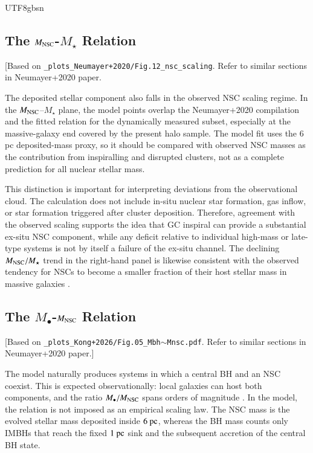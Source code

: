 \documentclass[trackchanges, twocolappendix, twocolumn]{aastex701}
\newcommand{\czkong}[1]{{\color{magenta}#1}}
\begin{document}
\begin{CJK*}{UTF8}{gbsn}
\subsection{The $M_{\rm NSC}$-$M_\star$ Relation} \label{subsect:Mnsc-Mstar}

\czkong{[Based on \texttt{\_plots\_Neumayer+2020/Fig.12\_nsc\_scaling}. Refer to similar sections in Neumayer+2020 paper.}

The deposited stellar component also falls in the observed NSC scaling regime. In the $M_{\rm NSC}$--$M_\star$ plane, the model points overlap the Neumayer+2020 compilation and the fitted relation for the dynamically measured subset, especially at the massive-galaxy end covered by the present halo sample. The model fit uses the 6 pc deposited-mass proxy, so it should be compared with observed NSC masses as the contribution from inspiralling and disrupted clusters, not as a complete prediction for all nuclear stellar mass.

This distinction is important for interpreting deviations from the observational cloud. The calculation does not include in-situ nuclear star formation, gas inflow, or star formation triggered after cluster deposition. Therefore, agreement with the observed scaling supports the idea that GC inspiral can provide a substantial ex-situ NSC component, while any deficit relative to individual high-mass or late-type systems is not by itself a failure of the ex-situ channel. The declining $M_{\rm NSC}/M_\star$ trend in the right-hand panel is likewise consistent with the observed tendency for NSCs to become a smaller fraction of their host stellar mass in massive galaxies \citep{Neumayer+2020}.

\subsection{The $M_\bullet$-$M_{\rm NSC}$ Relation} \label{subsect:Mbh-Mnsc}

\czkong{[Based on \texttt{\_plots\_Kong+2026/Fig.05\_Mbh$\sim$Mnsc.pdf}. Refer to similar sections in Neumayer+2020 paper.]}

The model naturally produces systems in which a central BH and an NSC coexist. This is expected observationally: local galaxies can host both components, and the ratio $M_\bullet/M_{\rm NSC}$ spans orders of magnitude \citep{Neumayer+2020}. In the model, the relation is not imposed as an empirical scaling law. The NSC mass is the evolved stellar mass deposited inside $6~{\rm pc}$, whereas the BH mass counts only IMBHs that reach the fixed $1~{\rm pc}$ sink and the subsequent accretion of the central BH state.


\end{CJK*}
\end{document}
